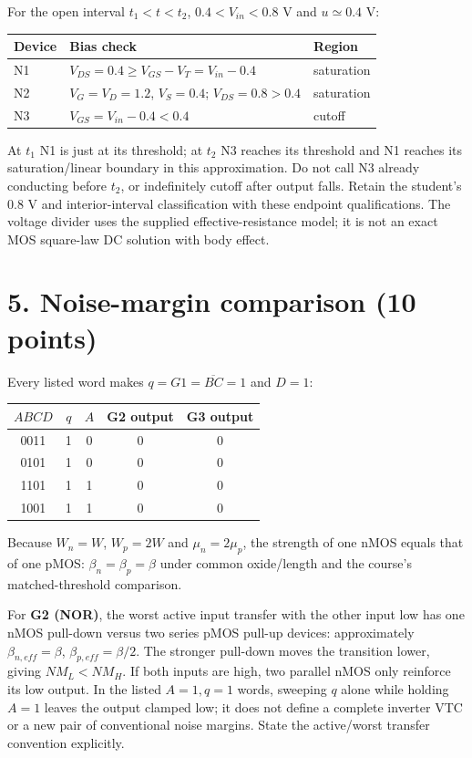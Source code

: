 \documentclass[10pt]{article}
\begin{document}
For the open interval $t_1<t<t_2$, $0.4<V_{in}<0.8$ V and $u\simeq0.4$ V:
\begin{center}\begin{tabular}{lll}\toprule Device&Bias check&Region\\\midrule
N1&$V_{DS}=0.4\ge V_{GS}-V_T=V_{in}-0.4$&saturation\\
N2&$V_G=V_D=1.2$, $V_S=0.4$; $V_{DS}=0.8>0.4$&saturation\\
N3&$V_{GS}=V_{in}-0.4<0.4$&cutoff\\\bottomrule\end{tabular}\end{center}
At $t_1$ N1 is just at its threshold; at $t_2$ N3 reaches its threshold and N1 reaches its saturation/linear boundary in this approximation. Do not call N3 already conducting before $t_2$, or indefinitely cutoff after output falls. Retain the student's 0.8 V and interior-interval classification with these endpoint qualifications. The voltage divider uses the supplied effective-resistance model; it is not an exact MOS square-law DC solution with body effect.

\newpage\section*{5. Noise-margin comparison (10 points)}
Every listed word makes $q=G1=\overline{BC}=1$ and $D=1$:
\begin{center}\begin{tabular}{ccccc}\toprule $ABCD$&$q$&$A$&G2 output& G3 output\\\midrule
0011&1&0&0&0\\0101&1&0&0&0\\1101&1&1&0&0\\1001&1&1&0&0\\\bottomrule\end{tabular}\end{center}
Because $W_n=W$, $W_p=2W$ and $\mu_n=2\mu_p$, the strength of one nMOS equals that of one pMOS: $\beta_n=\beta_p=\beta$ under common oxide/length and the course's matched-threshold comparison.

For \textbf{G2 (NOR)}, the worst active input transfer with the other input low has one nMOS pull-down versus two series pMOS pull-up devices: approximately $\beta_{n,eff}=\beta$, $\beta_{p,eff}=\beta/2$. The stronger pull-down moves the transition lower, giving $\boxed{NM_L<NM_H}$. If both inputs are high, two parallel nMOS only reinforce its low output. In the listed $A=1,q=1$ words, sweeping $q$ alone while holding $A=1$ leaves the output clamped low; it does not define a complete inverter VTC or a new pair of conventional noise margins. State the active/worst transfer convention explicitly.
\end{document}
